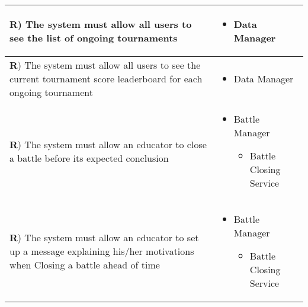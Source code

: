 \documentclass[../DD.tex]{subfiles}
\newcounter{rown}
\newcommand{\rowIndex}{\arabic{rown}\stepcounter{rown}}
\begin{document}
\begin{table}[h!]
\begin{center}
\begin{tabular}{|m{20em}|m{20em}|}
            \textbf{R\rowIndex}) The system must allow all users to see the list of ongoing tournaments & \begin{itemize}
                \item Data Manager
            \end{itemize}\\
            \hline
            \textbf{R\rowIndex}) The system must allow all users to see the current tournament score leaderboard for each ongoing tournament & \begin{itemize}
                \item Data Manager
            \end{itemize}\\
            \hline
            \textbf{R\rowIndex}) The system must allow an educator to close a battle before its expected conclusion & \begin{itemize}
                \item Battle Manager
                \begin{itemize}
                    \item Battle Closing Service
                \end{itemize} 
            \end{itemize}\\
            \hline
            \textbf{R\rowIndex}) The system must allow an educator to set up a message explaining his/her motivations when Closing a battle ahead of time & \begin{itemize}
                \item Battle Manager
                \begin{itemize}
                    \item Battle Closing Service
                \end{itemize} 
            \end{itemize}\\
            \hline
            \end{tabular}
        \end{center}
    \end{table}
    \newpage
\end{document}
